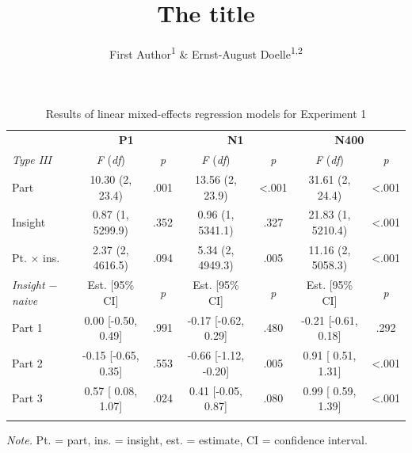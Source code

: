 \documentclass[
  english,
  man,floatsintext]{apa7}
\title{The title}
\author{First Author\textsuperscript{1} \& Ernst-August Doelle\textsuperscript{1,2}}
\date{}
\affiliation{\vspace{0.5cm}\textsuperscript{1} Wilhelm-Wundt-University\\\textsuperscript{2} Konstanz Business School}
\begin{document}
\maketitle

\begin{table}[tbp]

\begin{center}
\begin{threeparttable}

\caption{\label{tab:exp1-output}Results of linear mixed-effects regression models for Experiment 1}

\footnotesize{

\begin{tabular}{lcccccc}
\toprule
 & \multicolumn{2}{c}{\textbf{P1}} & \multicolumn{2}{c}{\textbf{N1}} & \multicolumn{2}{c}{\textbf{N400}} \\
\cmidrule(r){2-3} \cmidrule(r){4-5} \cmidrule(r){6-7}
\textit{Type III} & \textit{F} (\textit{df}) & \textit{p} & \textit{F} (\textit{df}) & \textit{p} & \textit{F} (\textit{df}) & \textit{p}\\
\midrule
Part & 10.30 (2,   23.4) & .001 & 13.56 (2,   23.9) & <.001 & 31.61 (2,   24.4) & <.001\\
Insight & 0.87 (1, 5299.9) & .352 & 0.96 (1, 5341.1) & .327 & 21.83 (1, 5210.4) & <.001\\
Pt. × ins. & 2.37 (2, 4616.5) & .094 & 5.34 (2, 4949.3) & .005 & 11.16 (2, 5058.3) & <.001\\
\textit{Insight $-$  naive} & Est. [95\% CI] & \textit{p} & Est. [95\% CI] & \textit{p} & Est. [95\% CI] & \textit{p}\\ \midrule
Part 1 & 0.00 [-0.50, 0.49] & .991 & -0.17 [-0.62,  0.29] & .480 & -0.21 [-0.61, 0.18] & .292\\
Part 2 & -0.15 [-0.65, 0.35] & .553 & -0.66 [-1.12, -0.20] & .005 & 0.91 [ 0.51, 1.31] & <.001\\
Part 3 & 0.57 [ 0.08, 1.07] & .024 & 0.41 [-0.05,  0.87] & .080 & 0.99 [ 0.59, 1.39] & <.001\\
\bottomrule
\addlinespace
\end{tabular}

}

\begin{tablenotes}[para]
\normalsize{\textit{Note.} Pt. = part, ins. = insight, est. = estimate, CI = confidence interval.}
\end{tablenotes}

\end{threeparttable}
\end{center}

\end{table}
\end{document}
